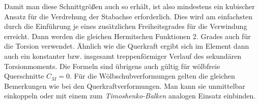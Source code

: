 Damit man diese Schnittgr\"{o}{\ss}en auch so erh\"{a}lt, ist also mindestens ein kubischer Ansatz f\"{u}r die Verdrehung der Stabachse erforderlich. Dies wird am einfachsten durch die Einf\"{u}hrung je eines zus\"{a}tzlichen Freiheitsgrades f\"{u}r die Verwindung erreicht. Dann werden die gleichen Hermitschen Funktionen 2. Grades auch f\"{u}r die Torsion verwendet. \"{A}hnlich wie die Querkraft ergibt sich im Element dann auch ein konstanter bzw. insgesamt treppenf\"{o}rmiger Verlauf des sekund\"{a}ren Torsionmoments. Die Formeln sind \"{u}brigens auch g\"{u}ltig f\"{u}r w\"{o}lbfreie Querschnitte $C_M = 0$. F\"{u}r die W\"{o}lbschubverformungen gelten die gleichen Bemerkungen wie bei den Querkraftverformungen. Man kann sie unmittelbar einkoppeln oder mit einem zum {\em Timoshenko-Balken\/} analogen Einsatz einbinden.

